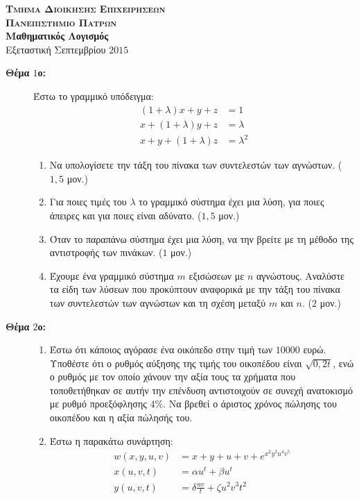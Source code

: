 \documentclass[a4paper,12pt]{article}
\begin{document}
\thispagestyle{empty}
\begin{center}
{\large\bfseries \textsc{Τμημα Διοικησης Επιχειρησεων \\
Πανεπιστημιο Πατρων}} \\[0,5cm]
\textbf{Μαθηματικός Λογισμός} \\[0,5cm]
Εξεταστική Σεπτεμβρίου $2015$
\end{center}
\vspace{0,5cm}
\begin{description}

\item [{\bfseries Θέμα $1$ο:}] Έστω το γραμμικό υπόδειγμα:
\begin{align*}
(1+\lambda)x + y + z &= 1 \\
x + (1 + \lambda)y + z &=\lambda\\
x+y+(1+\lambda)z&=\lambda^2
\end{align*}

\begin{enumerate}

\item Να υπολογίσετε την τάξη του πίνακα των συντελεστών των αγνώστων. ($1,5$ μον.)
\item Για ποιες τιμές του $\lambda$ το γραμμικό σύστημα έχει μια λύση, για ποιες άπειρες και για ποιες είναι αδύνατο. ($1,5$ μον.)
\item Όταν το παραπάνω σύστημα έχει μια λύση, να την βρείτε με τη μέθοδο της αντιστροφής των πινάκων. ($1$ μον.)
\item Έχουμε ένα γραμμικό σύστημα $m$ εξισώσεων με $n$ αγνώστους. Αναλύστε τα είδη των λύσεων που προκύπτουν αναφορικά με την τάξη του πίνακα των συντελεστών των αγνώστων και τη σχέση μεταξύ $m$ και $n$. ($2$ μον.)

\end{enumerate}

\item [{\bfseries Θέμα $2$ο:}] 
\begin{enumerate}
\item Έστω ότι κάποιος αγόρασε ένα οικόπεδο στην τιμή των $10000$ ευρώ. Υποθέστε ότι ο ρυθμός αύξησης της τιμής του οικοπέδου είναι $\sqrt{0,2t}$, ενώ ο ρυθμός με τον οποίο χάνουν την αξία τους τα χρήματα που τοποθετήθηκαν σε αυτήν την επένδυση αντιστοιχούν σε συνεχή ανατοκισμό με ρυθμό προεξόφλησης $4\%$. Να βρεθεί ο άριστος χρόνος πώλησης του οικοπέδου και η αξία πώλησής του.

\item Έστω η παρακάτω συνάρτηση:
\begin{align*}
w(x,y,u,v) &= x+y+u+v+e^{x^2y^3u^4v^5}\\
x(u,v,t) &=\alpha u^t+\beta u^t\\
y(u,v,t) &=\delta\frac{uv}{t}+ \zeta u^2v^3t^2
\end{align*}


\end{enumerate}
\end{description}
\end{document}
